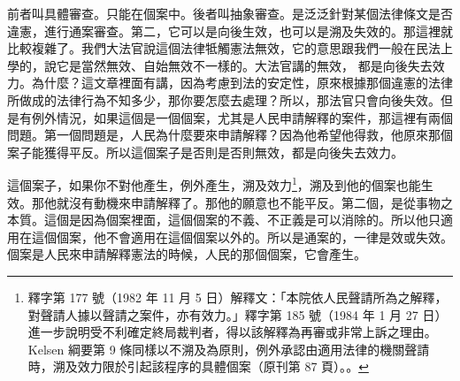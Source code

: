 \hypertarget{w05:cue:148}{}前者叫具體審查。只能在個案中。後者叫抽象審查。是泛泛針對某個法律條文是否違憲，進行通案審查。第二，它可以是向後生效，也可以是溯及失效的。那這裡就比較複雜了。我們大法官說這個法律牴觸憲法無效，它的意思跟我們一般在民法上學的，說它是當然無效、自始無效不一樣的。大法官講的無效，
\hypertarget{w05:cue:149}{}都是向後失去效力。為什麼？這文章裡面有講，因為考慮到法的安定性，原來根據那個違憲的法律所做成的法律行為不知多少，那你要怎麼去處理？所以，那法官只會向後失效。但是有例外情況，如果這個是一個個案，尤其是人民申請解釋的案件，那這裡有兩個問題。第一個問題是，人民為什麼要來申請解釋？因為他希望他得救，他原來那個案子能獲得平反。所以這個案子是否則是否則無效，都是向後失去效力。

\hypertarget{w05:cue:150}{}這個案子，如果你不對他產生，例外產生，溯及效力\footnote{釋字第 177 號（1982 年 11 月 5 日）解釋文：「本院依人民聲請所為之解釋，對聲請人據以聲請之案件，亦有效力。」釋字第 185 號（1984 年 1 月 27 日）進一步說明受不利確定終局裁判者，得以該解釋為再審或非常上訴之理由。Kelsen 綱要第 9 條同樣以不溯及為原則，例外承認由適用法律的機關聲請時，溯及效力限於引起該程序的具體個案（原刊第 87 頁）。\cite[87]{kelsen1929}。}，溯及到他的個案也能生效。那他就沒有動機來申請解釋了。那他的願意也不能平反。第二個，是從事物之本質。這個是因為個案裡面，這個個案的不義、不正義是可以消除的。所以他只適用在這個個案，他不會適用在這個個案以外的。所以是通案的，一律是效或失效。個案是人民來申請解釋憲法的時候，人民的那個個案，它會產生。

